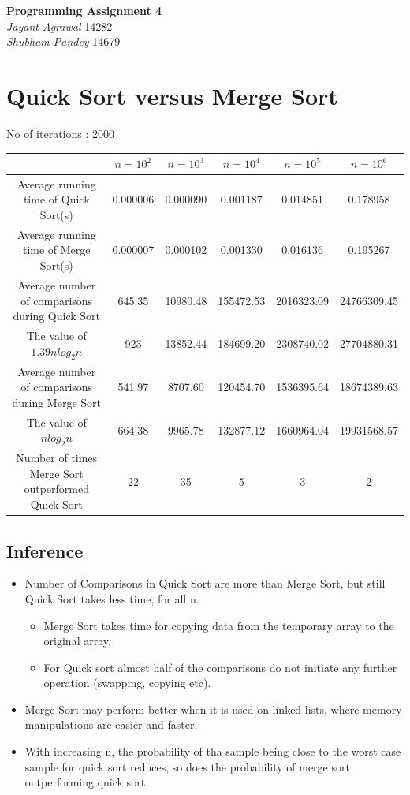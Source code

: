 \documentclass{article}
\begin{document}

\begin{center}
\textbf{\Large Programming Assignment 4} \\
\textit{\large Jayant Agrawal}         14282 \\
\textit{\large Shubham Pandey}         14679
\end{center}

\section{Quick Sort versus Merge Sort}

No of iterations : 2000
\begin{center}
\begin{tabular}{||c|c|c|c|c|c||}
\hline
 		&  $n=10^2$ & $n=10^3$ &$n=10^4$  & $n=10^5$ &$n=10^6$   \\
\hline
Average running time of Quick Sort(s) &
0.000006&
0.000090&
0.001187&
0.014851&
0.178958\\
\hline
Average running time of Merge Sort(s) &
0.000007&
0.000102&
0.001330&
0.016136&
0.195267 \\
\hline
Average number of comparisons during Quick Sort & 
645.35&
10980.48&
155472.53&
2016323.09&
24766309.45 \\
\hline
The value of $1.39nlog_{2}n$ & 923 & 13852.44 &184699.20 &2308740.02 &27704880.31 \\ 
\hline
Average number of comparisons during Merge Sort&
541.97&
8707.60&
120454.70&
1536395.64&
18674389.63\\
\hline
The value of $nlog_{2}n$ & 664.38 &9965.78 &132877.12 &1660964.04 &19931568.57 \\
\hline
Number of times Merge Sort outperformed Quick Sort & 22 &35 &5 &3 & 2 \\
\hline
\end{tabular}
\end{center}

\subsection{Inference}
\begin{itemize}
\item Number of Comparisons in Quick Sort are more than Merge Sort, but still Quick Sort takes less time, for all n.
	\begin{itemize}
	\item Merge Sort takes time for copying data from the temporary array to the original array.
	\item For Quick sort almost half of the comparisons do not initiate any further operation (swapping, copying etc).
	\end{itemize}
\item Merge Sort may perform better when it is used on linked lists, where memory manipulations are easier and faster.
\item With increasing n, the probability of tha sample being close to the worst case sample for quick sort reduces, so does the probability of merge sort outperforming quick sort.
\end{itemize}
\end{document}
